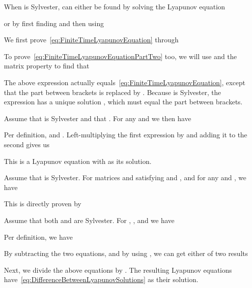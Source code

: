 \documentclass[twocolumn]{autart}
\begin{document}
\begin{thm}\label{th:FiniteIntegralToLyapunov}
When  is Sylvester,  can either be found by solving the Lyapunov equation

or by first finding  and then using

\end{thm}
\begin{pf}
We first prove~\eqref{eq:FiniteTimeLyapunovEquation} through

To prove~\eqref{eq:FiniteTimeLyapunovEquationPartTwo} too, we will use  and the matrix property  to find that

The above expression actually equals~\eqref{eq:FiniteTimeLyapunovEquation}, except that the part between brackets is replaced by . Because  is Sylvester, the expression has a unique solution , which must equal the part between brackets.
\end{pf}

\begin{thm}\label{th:AddingLyapunovSolutions}
Assume that  is Sylvester and that . For any  and  we then have

\end{thm}
\begin{pf}
Per definition,  and . Left-multiplying the first expression by  and adding it to the second gives us

This is a Lyapunov equation with  as its solution.
\end{pf}

\begin{thm}\label{th:InterchangeLyapunovSolutions}
Assume that  is Sylvester. For matrices  and  satisfying  and , and for any  and , we have

\end{thm}
\begin{pf}
This is directly proven by

\end{pf}

\begin{thm}\label{th:DifferenceBetweenLyapunovSolutions}
Assume that both  and  are Sylvester. For , ,  and  we have

\end{thm}
\begin{pf}
Per definition, we have

By subtracting the two equations, and by using , we can get either of two results

Next, we divide the above equations by . The resulting Lyapunov equations have~\eqref{eq:DifferenceBetweenLyapunovSolutions} as their solution.
\end{pf}
\end{document}

